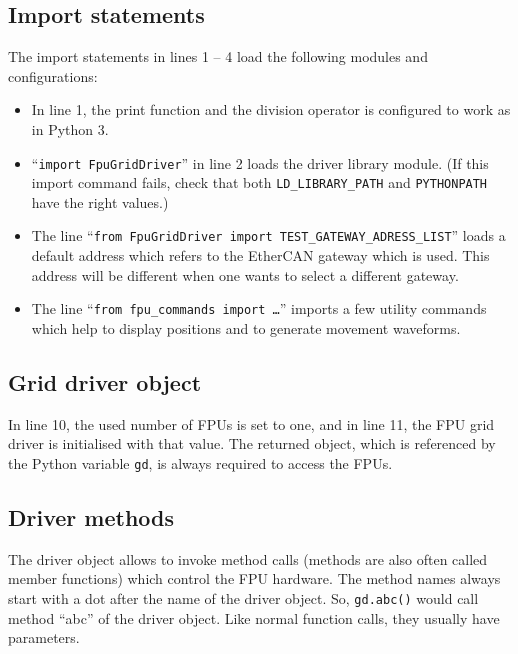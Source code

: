 \documentclass{scrartcl}[12pt,a4paper]
\begin{document}
\subsection{Import statements}

The import statements in lines 1 -- 4 load the following modules and
configurations:

\begin{itemize}
\item In line 1, the print function and the division operator is
  configured to work as in Python 3.
  
\item ``\texttt{import FpuGridDriver}'' in line 2 loads the driver
  library module. (If this import command fails, check that both
  \verb+LD_LIBRARY_PATH+ and \verb+PYTHONPATH+ have the right values.)

\item The line ``\texttt{from FpuGridDriver import
  TEST\_GATEWAY\_ADRESS\_LIST}'' loads a default address which refers to
  the EtherCAN gateway which is used. This address will be different
  when one wants to select a different gateway.

\item The line ``\texttt{from fpu\_commands import \ldots}'' imports a
  few utility commands which help to display positions and to generate
  movement waveforms.

 
\end{itemize}

\subsection{Grid driver object}

In line 10, the used number of FPUs is set to one, and in line 11, the
FPU grid driver is initialised with that value. The returned object,
which is referenced by the Python variable \texttt{gd}, is always
required to access the FPUs.

\subsection{Driver methods}

The driver object allows to invoke method calls (methods are also
often called member functions) which control the FPU hardware. The
method names always start with a dot after the name of the driver
object.  So, \texttt{gd.abc()} would call method ``abc'' of the driver
object. Like normal function calls, they usually have parameters.
\end{document}
